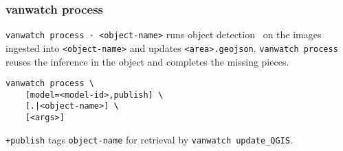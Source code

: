 \subsubsection{vanwatch process}
\label{vanwatch_process}

\texttt{vanwatch process - <object-name>} runs object detection~ on the images ingested into \texttt{<object-name>} and updates \texttt{<area>.geojson}. \texttt{vanwatch process} reuses the inference in the object and completes the missing pieces.
%
\begin{verbatim}
vanwatch process \
    [model=<model-id>,publish] \
    [.|<object-name>] \
    [<args>]
\end{verbatim}
%
\texttt{+publish} tags \texttt{object-name} for retrieval by \texttt{vanwatch update\_QGIS}.